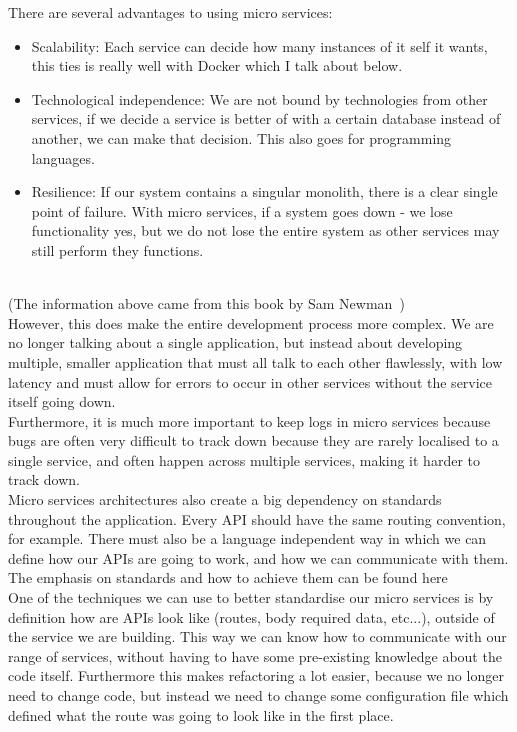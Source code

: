\documentclass[titlepage]{article}
\begin{document}
There are several advantages to using micro services:
\begin{itemize}
  \item Scalability: Each service can decide how many instances of it self it wants, this ties is really well with Docker which I talk about below.
  \item Technological independence: We are not bound by technologies from other services, if we decide a service is better of with a certain database instead of another, we can make that decision. This also goes for programming languages.
  \item Resilience: If our system contains a singular monolith, there is a clear single point of failure. With micro services, if a system goes down - we lose functionality yes, but we do not lose the entire system as other services may still perform they functions.
\end{itemize} \\

(The information above came from this book by Sam Newman~\cite{newman_2016}) \\

However, this does make the entire development process more complex. We are no longer talking about a single application, but instead about developing multiple, smaller application that must all talk to each other flawlessly, with low latency and must allow for errors to occur in other services without the service itself going down. \\

Furthermore, it is much more important to keep logs in micro services because bugs are often very difficult to track down because they are rarely localised to a single service, and often happen across multiple services, making it harder to track down. \\

Micro services architectures also create a big dependency on standards throughout the application. Every API should have the same routing convention, for example. There must also be a language independent way in which we can define how our APIs are going to work, and how we can communicate with them. The emphasis on standards and how to achieve them can be found here~\cite{microservices_talk} \\

One of the techniques we can use to better standardise our micro services is by definition how are APIs look like (routes, body required data, etc...), outside of the service we are building. This way we can know how to communicate with our range of services, without having to have some pre-existing knowledge about the code itself. Furthermore this makes refactoring a lot easier, because we no longer need to change code, but instead we need to change some configuration file which defined what the route was going to look like in the first place.
\end{document}
